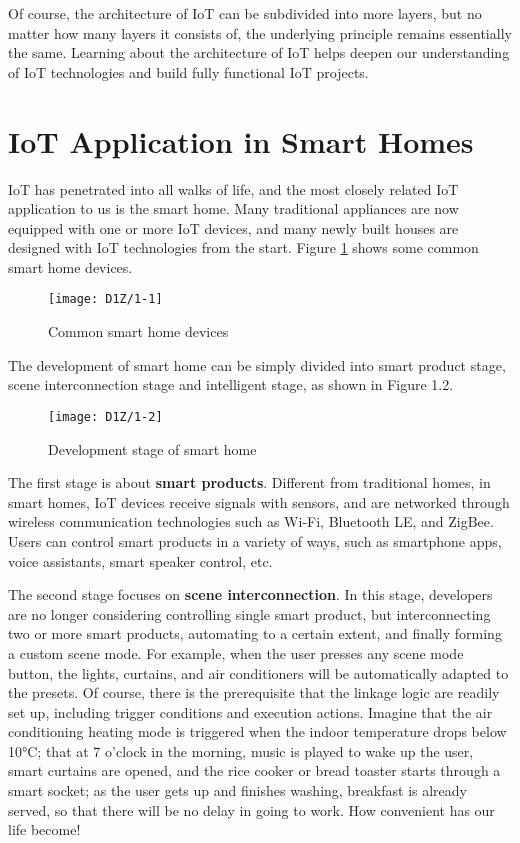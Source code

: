 \documentclass[a4paper,12pt]{book}
\begin{document}
Of course, the architecture of IoT can be subdivided into more layers, but no matter how many layers it consists of, the underlying principle remains essentially the same. Learning about the architecture of IoT helps deepen our understanding of IoT technologies and build fully functional IoT projects.

\section{IoT Application in Smart Homes}
IoT has penetrated into all walks of life, and the most closely related IoT application to us is the smart home. Many traditional appliances are now equipped with one or more IoT devices, and many newly built houses are designed with IoT technologies from the start. Figure \ref{Common smart home devices} shows some common smart home devices.

\begin{figure}[!ht]
    \centering
    \texttt{[image: D1Z/1-1]}
    \caption{Common smart home devices}
    \label{Common smart home devices}
\end{figure}

The development of smart home can be simply divided into smart product stage, scene interconnection stage and intelligent stage, as shown in Figure 1.2.

\begin{figure}[!ht]
    \centering
    \texttt{[image: D1Z/1-2]}
    \caption{Development stage of smart home}
\end{figure}

The first stage is about \textbf{smart products}. Different from traditional homes, in smart homes, IoT devices receive signals with sensors, and are networked through wireless communication technologies such as Wi-Fi, Bluetooth LE, and ZigBee. Users can control smart products in a variety of ways, such as smartphone apps, voice assistants, smart speaker control, etc.

The second stage focuses on \textbf{scene interconnection}. In this stage, developers are no longer considering controlling single smart product, but interconnecting two or more smart products, automating to a certain extent, and finally forming a custom scene mode. For example, when the user presses any scene mode button, the lights, curtains, and air conditioners will be automatically adapted to the presets. Of course, there is the prerequisite that the linkage logic are readily set up, including trigger conditions and execution actions. Imagine that the air conditioning heating mode is triggered when the indoor temperature drops below 10°C; that at 7 o’clock in the morning, music is played to wake up the user, smart curtains are opened, and the rice cooker or bread toaster starts through a smart socket; as the user gets up and finishes washing, breakfast is already served, so that there will be no delay in going to work. How convenient has our life become!
\end{document}
